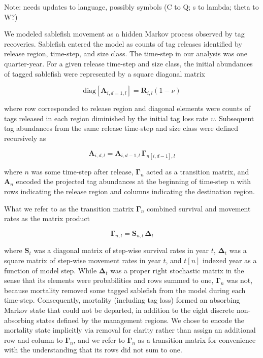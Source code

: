 \documentclass{article}
\begin{document}
\noindent Note: needs updates to language, possibly symbols (C to Q; s to lambda; theta to W?) 

We modeled sablefish movement as a hidden Markov process \cite[][]{langrock-2012-flexible-practical} observed by tag recoveries. Sablefish entered the model as counts of tag releases identified by release region, time-step, and size class. The time-step in our analysis was one quarter-year. For a given release time-step and size class, the initial abundances of tagged sablefish were represented by a square diagonal matrix 

\begin{equation}
  \label{eq:abundance-initial}
  \mathrm{diag} \! \left[\boldsymbol{A}_{i,d=1,l}\right] = \boldsymbol{R}_{i,l} \left(1 - \nu \right)
\end{equation}


where row corresponded to release region and diagonal elements were counts of tags released in each region diminished by the initial tag loss rate $\upsilon$. Subsequent tag abundances from the same release time-step and size class were defined recursively as 

\begin{equation}
    \label{eq:abundance}
    \boldsymbol{A}_{i,d,l} = \boldsymbol{A}_{i,d-1,l} \, \boldsymbol{\Gamma}_{n[i,d-1],l}
\end{equation}

\noindent where $n$ was some time-step after release, $\boldsymbol{\Gamma}_n$ acted as a transition matrix, and $\boldsymbol{A}_n$ encoded the projected tag abundances at the beginning of time-step $n$ with rows indicating the release region and columns indicating the destination region. 

What we refer to as the transition matrix $\boldsymbol{\Gamma}_n$ combined survival and movement rates as the matrix product

\begin{equation}
    \label{eq:transition}
    \boldsymbol{\Gamma}_{n,l} = \boldsymbol{S}_{n,l} \, \boldsymbol{\Delta}_{l}
\end{equation}

\noindent where $\boldsymbol{S}_t$ was a diagonal matrix of step-wise survival rates in year $t$, $\boldsymbol{\Delta}_t$ was a square matrix of step-wise movement rates in year $t$, and $t[n]$ indexed year as a function of model step. While $\boldsymbol{\Delta}_t$ was a proper right stochastic matrix in the sense that its elements were probabilities and rows summed to one, $\boldsymbol{\Gamma}_n$ was not, because mortality removed some tagged sablefish from the model during each time-step. Consequently, mortality (including tag loss) formed an absorbing Markov state that could not be departed, in addition to the eight discrete non-absorbing states defined by the management regions. We chose to encode the mortality state implicitly via removal for clarity rather than assign an additional row and column to $\boldsymbol{\Gamma}_n$, and we refer to $\boldsymbol{\Gamma}_n$ as a transition matrix for convenience with the understanding that its rows did not sum to one.
\end{document}
